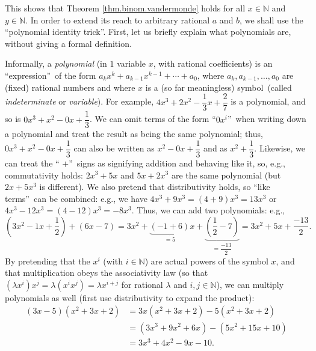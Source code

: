 \documentclass[numbers=enddot,12pt,final,onecolumn,notitlepage]{scrartcl}%
\numberwithin{exer}{subsection}
\theoremstyle{definition}
\begin{document}
This shows that Theorem \ref{thm.binom.vandermonde} holds for all
$x\in\mathbb{N}$ and $y\in\mathbb{N}$. In order to extend its reach to
arbitrary rational $a$ and $b$, we shall use the \textquotedblleft polynomial
identity trick\textquotedblright. First, let us briefly explain what
polynomials are, without giving a formal definition.

Informally, a \textit{polynomial} (in $1$ variable $x$, with rational
coefficients) is an \textquotedblleft expression\textquotedblright\ of the
form $a_{k}x^{k}+a_{k-1}x^{k-1}+\cdots+a_{0}$, where $a_{k},a_{k-1}%
,\ldots,a_{0}$ are (fixed) rational numbers and where $x$ is a (so far
meaningless) symbol\ (called \textit{indeterminate} or \textit{variable}). For
example, $4x^{3}+2x^{2}-\dfrac{1}{3}x+\dfrac{2}{7}$ is a polynomial, and so is
$0x^{3}+x^{2}-0x+\dfrac{1}{3}$. We can omit terms of the form
\textquotedblleft$0x^{i}$\textquotedblright\ when writing down a polynomial
and treat the result as being the same polynomial; thus, $0x^{3}%
+x^{2}-0x+\dfrac{1}{3}$ can also be written as $x^{2}-0x+\dfrac{1}{3}$ and as
$x^{2}+\dfrac{1}{3}$. Likewise, we can treat the \textquotedblleft%
$+$\textquotedblright\ signs as signifying addition and behaving like it, so,
e.g., commutativity holds: $2x^{3}+5x$ and $5x+2x^{3}$ are the same polynomial
(but $2x+5x^{3}$ is different). We also pretend that distributivity holds, so
\textquotedblleft like terms\textquotedblright\ can be combined: e.g., we have
$4x^{3}+9x^{3}=\left(  4+9\right)  x^{3}=13x^{3}$ or $4x^{3}-12x^{3}=\left(
4-12\right)  x^{3}=-8x^{3}$. Thus, we can add two polynomials: e.g.,%
\[
\left(  3x^{2}-1x+\dfrac{1}{2}\right)  +\left(  6x-7\right)  =3x^{2}%
+\underbrace{\left(  -1+6\right)  }_{=5}x+\underbrace{\left(  \dfrac{1}%
{2}-7\right)  }_{=\dfrac{-13}{2}}=3x^{2}+5x+\dfrac{-13}{2}.
\]
By pretending that the $x^{i}$ (with $i\in\mathbb{N}$) are actual powers of
the symbol $x$, and that multiplication obeys the associativity law (so that
$\left(  \lambda x^{i}\right)  x^{j}=\lambda\left(  x^{i}x^{j}\right)
=\lambda x^{i+j}$ for rational $\lambda$ and $i,j\in\mathbb{N}$), we can
multiply polynomials as well (first use distributivity to expand the product):%
\begin{align*}
\left(  3x-5\right)  \left(  x^{2}+3x+2\right)   &  =3x\left(  x^{2}%
+3x+2\right)  -5\left(  x^{2}+3x+2\right) \\
&  =\left(  3x^{3}+9x^{2}+6x\right)  -\left(  5x^{2}+15x+10\right) \\
&  =3x^{3}+4x^{2}-9x-10.
\end{align*}
\end{document}
